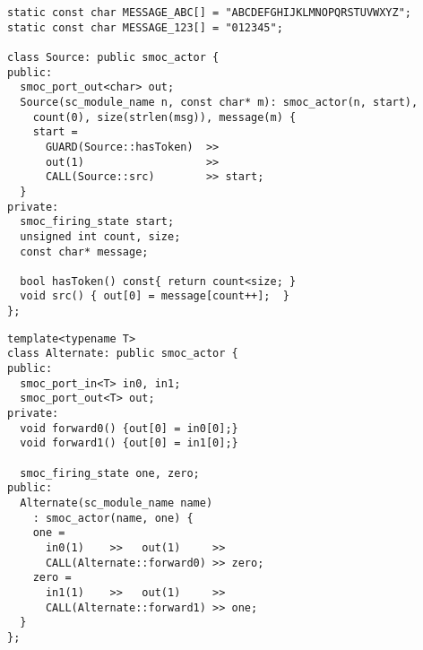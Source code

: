 \begin{frame}[fragile=singleslide]
\begin{lstlisting}
static const char MESSAGE_ABC[] = "ABCDEFGHIJKLMNOPQRSTUVWXYZ";
static const char MESSAGE_123[] = "012345";

class Source: public smoc_actor {
public:
  smoc_port_out<char> out;
  Source(sc_module_name n, const char* m): smoc_actor(n, start),
    count(0), size(strlen(msg)), message(m) {
    start = 
      GUARD(Source::hasToken)  >>
      out(1)                   >>
      CALL(Source::src)        >> start;
  }
private:
  smoc_firing_state start;
  unsigned int count, size;
  const char* message;

  bool hasToken() const{ return count<size; }
  void src() { out[0] = message[count++];  }
};
\end{lstlisting}
\end{frame}





\begin{frame}[fragile=singleslide]
\begin{lstlisting}
template<typename T>
class Alternate: public smoc_actor {
public:
  smoc_port_in<T> in0, in1;
  smoc_port_out<T> out;
private:
  void forward0() {out[0] = in0[0];}
  void forward1() {out[0] = in1[0];}

  smoc_firing_state one, zero;
public:
  Alternate(sc_module_name name)
    : smoc_actor(name, one) {
    one =
      in0(1)    >>   out(1)     >>
      CALL(Alternate::forward0) >> zero;
    zero =
      in1(1)    >>   out(1)     >>
      CALL(Alternate::forward1) >> one;
  }
};
\end{lstlisting}
\end{frame}





